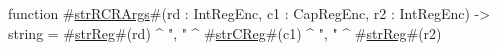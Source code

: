 function #\hyperref[sailMIPSzstrRCRArgs]{strRCRArgs}#(rd : IntRegEnc, c1 : CapRegEnc, r2 : IntRegEnc) -> string = #\hyperref[sailMIPSzstrReg]{strReg}#(rd) ^ ", " ^ #\hyperref[sailMIPSzstrCReg]{strCReg}#(c1) ^ ", " ^ #\hyperref[sailMIPSzstrReg]{strReg}#(r2)
